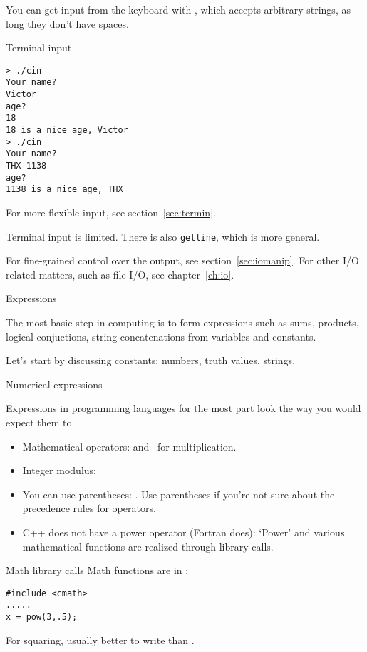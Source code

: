You can get input from the keyboard with ,
which accepts arbitrary strings, as long they don't have spaces.

\begin{block}{Terminal input}
  \label{sl:cin}
\begin{multicols}{2}
  \vfill
  \columnbreak
\begin{verbatim}
> ./cin
Your name?
Victor
age?
18
18 is a nice age, Victor
> ./cin
Your name?
THX 1138
age?
1138 is a nice age, THX
\end{verbatim}
\end{multicols}
\end{block}

For more flexible input, see section~\ref{sec:termin}.

\begin{slide}{Terminal input}
  \label{sl:cin-more}
   is limited.
  There is also \lstinline{getline}, which is more general.
\end{slide}

For fine-grained control over the output, see section~\ref{sec:iomanip}.
For other I/O related matters, such as file I/O, see chapter~\ref{ch:io}.

 {Expressions}
\label{sec:expr}

The most basic step in computing is to form expressions such as sums,
products, logical conjuctions, string concatenations
from variables and constants.

Let's start by discussing constants:
numbers, truth values, strings.

 {Numerical expressions}

Expressions in
programming languages for the most part look the way you would expect
them to.
\begin{itemize}
\item Mathematical operators: \n{+ - /} and \n{*}~for multiplication.
\item Integer modulus:~
\item You can use parentheses: . Use parentheses if you're
  not sure about the precedence rules for operators.
\item C++ does not have a power operator (Fortran does): `Power' and
  various mathematical functions are realized through library calls.
\end{itemize}

\begin{block}{Math library calls}
  \label{sl:cmath}
  Math functions are in :
\begin{lstlisting}
#include <cmath>
.....
x = pow(3,.5);
\end{lstlisting}
For squaring, usually better to write  than .
\end{block}

